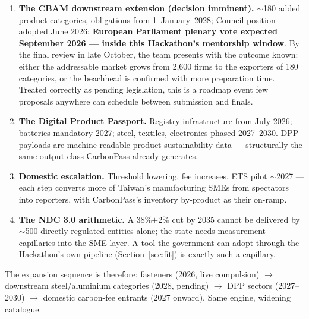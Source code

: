 \begin{enumerate}[leftmargin=1.4em]
\item \textbf{The CBAM downstream extension (decision imminent).} $\sim$180
added product categories, obligations from 1~January~2028; Council position
adopted June 2026; \textbf{European Parliament plenary vote expected September
2026 --- inside this Hackathon's mentorship window}\cite{akin}. By the final
review in late October, the team presents with the outcome known: either the
addressable market grows from 2,600 firms to the exporters of 180 categories,
or the beachhead is confirmed with more preparation time. Treated correctly as
pending legislation, this is a roadmap event few proposals anywhere can
schedule between submission and finals.
\item \textbf{The Digital Product Passport.} Registry infrastructure from July
2026; batteries mandatory 2027; steel, textiles, electronics phased
2027--2030\cite{espr}. DPP payloads are machine-readable product sustainability
data --- structurally the same output class CarbonPass already generates.
\item \textbf{Domestic escalation.} Threshold lowering, fee increases, ETS
pilot $\sim$2027\cite{ecobiz} --- each step converts more of Taiwan's
manufacturing SMEs from spectators into reporters, with CarbonPass's inventory
by-product as their on-ramp.
\item \textbf{The NDC 3.0 arithmetic.} A 38\%$\pm$2\% cut by 2035\cite{ndc}
cannot be delivered by $\sim$500 directly regulated entities alone; the state
needs measurement capillaries into the SME layer. A tool the government can
adopt through the Hackathon's own pipeline (Section~\ref{sec:fit}) is exactly
such a capillary.
\end{enumerate}

The expansion sequence is therefore: fasteners (2026, live compulsion) $\to$
downstream steel/aluminium categories (2028, pending) $\to$ DPP sectors
(2027--2030) $\to$ domestic carbon-fee entrants (2027 onward). Same engine,
widening catalogue.
